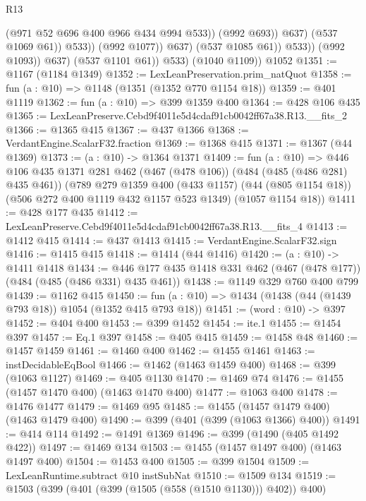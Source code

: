 \begin{lexlean}{R13}
\begin{coremodule}
                                    (@971 @52 @696 @400 @966 @434 @994 @533))
                                  (@992 @693))
                                @637)
                              (@537 @1069 @61))
                            @533))
                        (@992 @1077))
                      @637)
                    (@537 @1085 @61))
                  @533))
              (@992 @1093))
            @637)
          (@537 @1101 @61))
        @533)
      (@1040 @1109))
    @1052
@1351 := @1167 (@1184 @1349)
@1352 := LexLeanPreservation.prim_natQuot
@1358 := fun (a : @10) => @1148 (@1351 (@1352 @770 @1154 @18))
@1359 := @401 @1119
@1362 := fun (a : @10) => @399 @1359 @400
@1364 := @428 @106 @435
@1365 := LexLeanPreserve.Cebd9f4011e5d4cdaf91cb0042ff67a38.R13.__fits_2
@1366 := @1365 @415
@1367 := @437 @1366
@1368 := VerdantEngine.ScalarF32.fraction
@1369 := @1368 @415
@1371 := @1367 (@44 @1369)
@1373 := (a : @10) -> @1364 @1371
@1409 := fun (a : @10) =>
  @446
    @106
    @435
    @1371
    @281
    @462
    (@467 (@478 @106))
    (@484 (@485 (@486 @281) @435 @461))
    (@789
      @279
      @1359
      @400
      (@433 @1157)
      (@44 (@805 @1154 @18))
      (@506 @272 @400 @1119 @432 @1157 @523 @1349)
      (@1057 @1154 @18))
@1411 := @428 @177 @435
@1412 := LexLeanPreserve.Cebd9f4011e5d4cdaf91cb0042ff67a38.R13.__fits_4
@1413 := @1412 @415
@1414 := @437 @1413
@1415 := VerdantEngine.ScalarF32.sign
@1416 := @1415 @415
@1418 := @1414 (@44 @1416)
@1420 := (a : @10) -> @1411 @1418
@1434 := @446 @177 @435 @1418 @331 @462 (@467 (@478 @177)) (@484 (@485 (@486 @331) @435 @461))
@1438 := @1149 @329 @760 @400 @799
@1439 := @1162 @415
@1450 := fun (a : @10) => @1434 (@1438 (@44 (@1439 @793 @18)) @1054 (@1352 @415 @793 @18))
@1451 := (word : @10) -> @397
@1452 := @404 @400
@1453 := @399 @1452
@1454 := ite.{1}
@1455 := @1454 @397
@1457 := Eq.{1} @397
@1458 := @405 @415
@1459 := @1458 @48
@1460 := @1457 @1459
@1461 := @1460 @400
@1462 := @1455 @1461
@1463 := instDecidableEqBool
@1466 := @1462 (@1463 @1459 @400)
@1468 := @399 (@1063 @1127)
@1469 := @405 @1130
@1470 := @1469 @74
@1476 := @1455 (@1457 @1470 @400) (@1463 @1470 @400)
@1477 := @1063 @400
@1478 := @1476 @1477
@1479 := @1469 @95
@1485 := @1455 (@1457 @1479 @400) (@1463 @1479 @400)
@1490 := @399 (@401 (@399 (@1063 @1366) @400))
@1491 := @414 @114
@1492 := @1491 @1369
@1496 := @399 (@1490 (@405 @1492 @422))
@1497 := @1469 @134
@1503 := @1455 (@1457 @1497 @400) (@1463 @1497 @400)
@1504 := @1453 @400
@1505 := @399 @1504
@1509 := LexLeanRuntime.subtract @10 instSubNat
@1510 := @1509 @134
@1519 := @1503 (@399 (@401 (@399 (@1505 (@558 (@1510 @1130))) @402)) @400)

\end{coremodule}
\end{lexlean}
